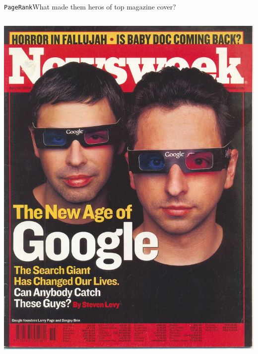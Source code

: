 \documentclass[xcolor=table,final]{beamer} %
\newcommand{\PageRank}{\texttt{PageRank}\xspace}
\begin{document}
\begin{frame}{\PageRank}{What made them heros of top magazine cover?}
  \begin{columns}
    \includegraphics[width=1.\textwidth]{figs/extras/brin-page-newsweek1}


\end{columns}
\end{frame}
\end{document}

